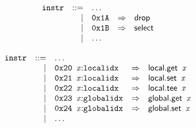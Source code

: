 \vspace{1ex}

$$
\begin{array}{@{}l@{}rrlll@{}l@{}}
& {\mathtt{instr}} &::=& \dots \\ &&|&
\mathtt{0x1A} &\Rightarrow& \mathsf{drop} \\ &&|&
\mathtt{0x1B} &\Rightarrow& \mathsf{select} \\ &&|&
\dots \\
\end{array}
$$

\vspace{1ex}

$$
\begin{array}{@{}l@{}rrlll@{}l@{}}
& {\mathtt{instr}} &::=& \dots \\ &&|&
\mathtt{0x20}~\,{\mathit{x}}{:}{\mathtt{localidx}} &\Rightarrow& \mathsf{local.get}~\,{\mathit{x}} \\ &&|&
\mathtt{0x21}~\,{\mathit{x}}{:}{\mathtt{localidx}} &\Rightarrow& \mathsf{local.set}~\,{\mathit{x}} \\ &&|&
\mathtt{0x22}~\,{\mathit{x}}{:}{\mathtt{localidx}} &\Rightarrow& \mathsf{local.tee}~\,{\mathit{x}} \\ &&|&
\mathtt{0x23}~\,{\mathit{x}}{:}{\mathtt{globalidx}} &\Rightarrow& \mathsf{global.get}~\,{\mathit{x}} \\ &&|&
\mathtt{0x24}~\,{\mathit{x}}{:}{\mathtt{globalidx}} &\Rightarrow& \mathsf{global.set}~\,{\mathit{x}} \\ &&|&
\dots \\
\end{array}
$$

\vspace{1ex}

